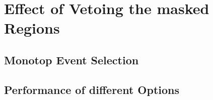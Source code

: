 \chapter{Effect of Vetoing the masked Regions}%

\section{Monotop Event Selection}

\section{Performance of different Options}